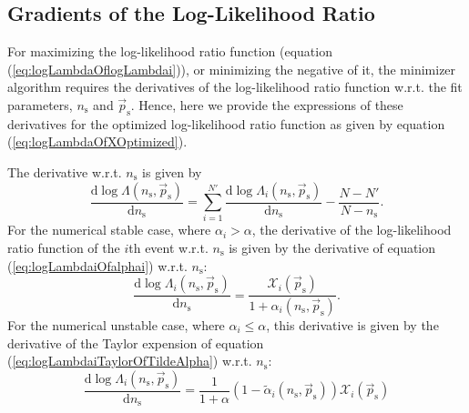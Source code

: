 \documentclass{article}
\newcommand{\ns}{n_{\mathrm{s}}}
\newcommand{\ps}{\vec{p}_{\mathrm{s}}}
\begin{document}
\subsection{Gradients of the Log-Likelihood Ratio}

For maximizing the log-likelihood ratio function (equation (\ref{eq:logLambdaOflogLambdai})),
or minimizing the negative of it, the minimizer algorithm requires the
derivatives of the log-likelihood ratio function w.r.t. the fit parameters,
$\ns$ and $\ps$.
Hence, here we provide the expressions of these derivatives
for the optimized log-likelihood ratio function as given by equation
(\ref{eq:logLambdaOfXOptimized}).

The derivative w.r.t. $\ns$ is given by
\begin{equation}
\frac{\mathrm{d} \log \Lambda(\ns,\ps)}{\mathrm{d} \ns} = \sum_{i=1}^{N'} \frac{\mathrm{d} \log \Lambda_i(\ns,\ps)}{\mathrm{d} \ns} - \frac{N - N'}{N - \ns}.
\end{equation}
For the numerical stable case, where $\alpha_i > \alpha$, the derivative of the
log-likelihood ratio function of the $i$th event w.r.t. $\ns$ is given by the
derivative of equation (\ref{eq:logLambdaiOfalphai}) w.r.t. $\ns$:
\begin{equation}
 \frac{\mathrm{d} \log \Lambda_i(\ns,\ps)}{\mathrm{d} \ns} = \frac{\mathcal{X}_i(\ps)}{1+\alpha_i(\ns,\ps)}.
 \label{eq:dlogLambdaidns-for-alphai-gt-alpha}
\end{equation}
For the numerical unstable case, where $\alpha_i \leq \alpha$, this derivative is
given by the derivative of the Taylor expension of equation (\ref{eq:logLambdaiTaylorOfTildeAlpha})
w.r.t. $\ns$:
\begin{equation}
 \frac{\mathrm{d}\log\Lambda_i(\ns,\ps)}{\mathrm{d} \ns} = \frac{1}{1+\alpha}\left(1 - \tilde{\alpha}_i(\ns,\ps)\right) \mathcal{X}_i(\ps)
 \label{eq:dlogLambdaidns-for-alphai-le-alpha}
\end{equation}
\end{document}
